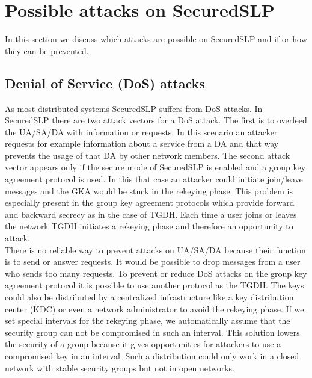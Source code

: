 \section{Possible attacks on SecuredSLP}
In this section we discuss which attacks are possible on
SecuredSLP and if or how they can be prevented.

\subsection{Denial of Service (DoS) attacks}\label{sec:-DoS}
As most distributed systems SecuredSLP suffers from DoS attacks. In SecuredSLP
there are two attack vectors for a DoS attack. The first is to overfeed the
UA/SA/DA with information or requests. In this scenario an attacker requests for
example information about a service from a DA and that way prevents the usage of that DA
by other network members. The second attack vector appears only if the secure
mode of SecuredSLP is enabled and a group key agreement protocol is used. In this
that case an attacker could initiate join/leave messages and the GKA would be
stuck in the rekeying phase. This problem is especially present in the group key
agreement protocols which provide forward and backward secrecy as in the case
of TGDH. Each time a user joins or leaves the network TGDH initiates a rekeying
phase and therefore an opportunity to attack.\\ There is no reliable
way to prevent attacks on UA/SA/DA because their function is to send or answer
requests. It would be possible to drop messages from a user who sends too many
requests. To prevent or reduce DoS attacks on the group key agreement protocol it
is possible to use another protocol as the TGDH. The keys could also be distributed
by a centralized infrastructure like a key distribution center (KDC) or even a
network administrator to avoid the rekeying phase. If we
set special intervals for the rekeying phase, we automatically assume that the
security group can not be compromised in such an interval. This solution lowers
the security of a group because it gives opportunities for attackers to use a
compromised key in an interval. Such a distribution could only work in a closed
network with stable security groups but not in open networks.


